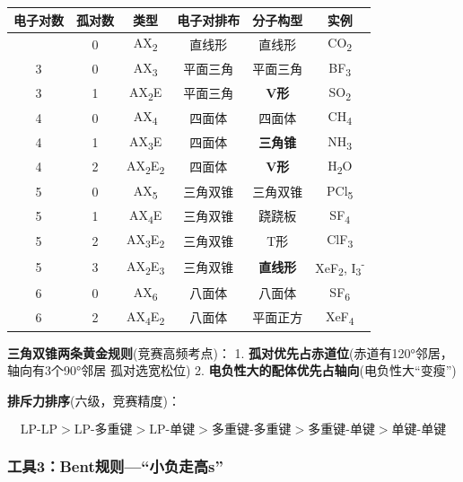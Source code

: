 {\def\LTcaptype{none} %
\begin{longtable}[]{@{}cccccc@{}}
\toprule\noalign{}
电子对数 & 孤对数 & 类型 & 电子对排布 & 分子构型 & 实例 \\
\midrule\noalign{}
\endhead
\bottomrule\noalign{}
\endlastfoot
2 & 0 & AX\textsubscript{2} & 直线形 & 直线形 & CO\textsubscript{2} \\
3 & 0 & AX\textsubscript{3} & 平面三角 & 平面三角 & BF\textsubscript{3} \\
3 & 1 & AX\textsubscript{2}E & 平面三角 & \textbf{V形} & SO\textsubscript{2} \\
4 & 0 & AX\textsubscript{4} & 四面体 & 四面体 & CH\textsubscript{4} \\
4 & 1 & AX\textsubscript{3}E & 四面体 & \textbf{三角锥} & NH\textsubscript{3} \\
4 & 2 & AX\textsubscript{2}E\textsubscript{2} & 四面体 & \textbf{V形} & H\textsubscript{2}O \\
5 & 0 & AX\textsubscript{5} & 三角双锥 & 三角双锥 & PCl\textsubscript{5} \\
5 & 1 & AX\textsubscript{4}E & 三角双锥 & 跷跷板 & SF\textsubscript{4} \\
5 & 2 & AX\textsubscript{3}E\textsubscript{2} & 三角双锥 & T形 & ClF\textsubscript{3} \\
5 & 3 & AX\textsubscript{2}E\textsubscript{3} & 三角双锥 & \textbf{直线形} & XeF\textsubscript{2}, I\textsubscript{3}\textsuperscript{-} \\
6 & 0 & AX\textsubscript{6} & 八面体 & 八面体 & SF\textsubscript{6} \\
6 & 2 & AX\textsubscript{4}E\textsubscript{2} & 八面体 & 平面正方 & XeF\textsubscript{4} \\
\end{longtable}
}

\textbf{三角双锥两条黄金规则}(竞赛高频考点)：
1. \textbf{孤对优先占赤道位}(赤道有120°邻居，轴向有3个90°邻居 \箭 孤对选宽松位)
2. \textbf{电负性大的配体优先占轴向}(电负性大``变瘦'')

\textbf{排斥力排序}(六级，竞赛精度)：

\[\text{LP-LP} > \text{LP-多重键} > \text{LP-单键} > \text{多重键-多重键} > \text{多重键-单键} > \text{单键-单键}\]

\subsubsection{工具3：Bent规则---``小负走高s''}\label{ux5de5ux51773bentux89c4ux5219ux5c0fux8d1fux8d70ux9ad8s}

